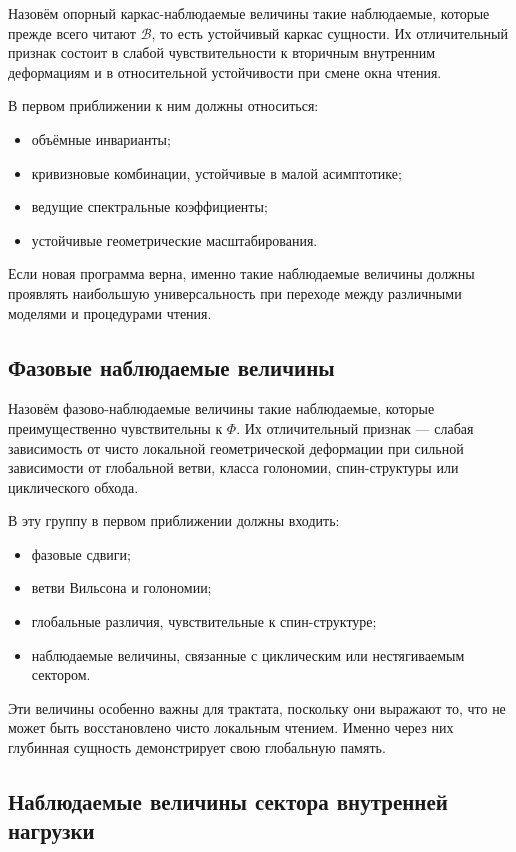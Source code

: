 \documentclass[12pt,a4paper]{article}
\begin{document}
Назовём опорный каркас-наблюдаемые величины такие наблюдаемые, которые прежде всего читают \(\mathcal{B}\), то есть устойчивый каркас сущности. Их отличительный признак состоит в слабой чувствительности к вторичным внутренним деформациям и в относительной устойчивости при смене окна чтения.

В первом приближении к ним должны относиться:
\begin{itemize}
    \item объёмные инварианты;
    \item кривизновые комбинации, устойчивые в малой асимптотике;
    \item ведущие спектральные коэффициенты;
    \item устойчивые геометрические масштабирования.
\end{itemize}

Если новая программа верна, именно такие наблюдаемые величины должны проявлять наибольшую универсальность при переходе между различными моделями и процедурами чтения.

\subsection{Фазовые наблюдаемые величины}

Назовём фазово-наблюдаемые величины такие наблюдаемые, которые преимущественно чувствительны к \(\Phi\). Их отличительный признак --- слабая зависимость от чисто локальной геометрической деформации при сильной зависимости от глобальной ветви, класса голономии, спин-структуры или циклического обхода.

В эту группу в первом приближении должны входить:
\begin{itemize}
    \item фазовые сдвиги;
    \item ветви Вильсона и голономии;
    \item глобальные различия, чувствительные к спин-структуре;
    \item наблюдаемые величины, связанные с циклическим или нестягиваемым сектором.
\end{itemize}

Эти величины особенно важны для трактата, поскольку они выражают то, что не может быть восстановлено чисто локальным чтением. Именно через них глубинная сущность демонстрирует свою глобальную память.

\subsection{Наблюдаемые величины сектора внутренней нагрузки}
\end{document}
